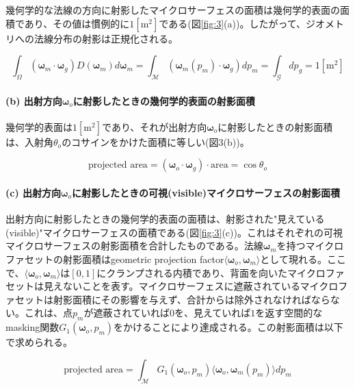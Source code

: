 \documentclass[a4j,xelatex,ja=standard]{bxjsarticle}
\begin{document}
幾何学的な法線の方向に射影したマイクロサーフェスの面積は幾何学的表面の面積であり、その値は慣例的に$1 [\text{m}^2]$である(図\ref{fig:3}(a))。したがって、ジオメトリへの法線分布の射影は正規化される。

\begin{equation}
    \int_\Omega (\boldsymbol{\omega}_m \cdot \boldsymbol{\omega}_g) D(\boldsymbol{\omega}_m) d\boldsymbol{\omega}_m = \int_\mathcal{M} (\boldsymbol{\omega}_m(p_m) \cdot \boldsymbol{\omega}_g) dp_m = \int_\mathcal{G} dp_g = 1 [\text{m}^2]
    \label{eq:9}
\end{equation}

\paragraph{(b) 出射方向$\boldsymbol{\omega}_o$に射影したときの幾何学的表面の射影面積}

幾何学的表面は$1 [\text{m}^2]$であり、それが出射方向$\boldsymbol{\omega}_o$に射影したときの射影面積は、入射角$\theta_o$のコサインをかけた面積に等しい(図3(b))。

\begin{equation}
    \text{projected area} = (\boldsymbol{\omega}_o \cdot \boldsymbol{\omega}_g) \cdot \text{area} = \cos \theta_o
    \label{eq:10}
\end{equation}

\paragraph{(c) 出射方向$\boldsymbol{\omega}_o$に射影したときの可視(visible)マイクロサーフェスの射影面積}

出射方向に射影したときの幾何学的表面の面積は、射影された"見えている(visible)"マイクロサーフェスの面積である(図\ref{fig:3}(c))。これはそれぞれの可視マイクロサーフェスの射影面積を合計したものである。法線$\boldsymbol{\omega}_m$を持つマイクロファセットの射影面積はgeometric projection factor$\langle \boldsymbol{\omega}_o, \boldsymbol{\omega}_m \rangle$として現れる。ここで、$\langle \boldsymbol{\omega}_o, \boldsymbol{\omega}_m \rangle$は$[0, 1]$にクランプされる内積であり、背面を向いたマイクロファセットは見えないことを表す。マイクロサーフェスに遮蔽されているマイクロファセットは射影面積にその影響を与えず、合計からは除外されなければならない。これは、点$p_m$が遮蔽されていれば$0$を、見えていれば$1$を返す空間的なmasking関数$G_1(\boldsymbol{\omega}_o, p_m)$をかけることにより達成される。この射影面積は以下で求められる。

\begin{equation}
    \text{projected area} = \int_\mathcal{M} G_1(\boldsymbol{\omega}_o, p_m) \langle \boldsymbol{\omega}_o, \boldsymbol{\omega}_m(p_m) \rangle dp_m
    \label{eq:11}
\end{equation}
\end{document}
